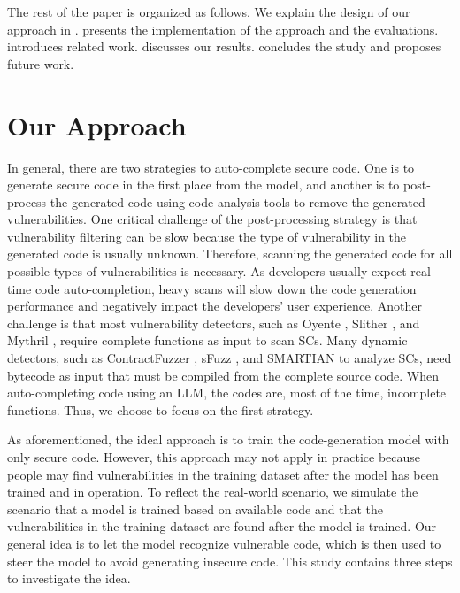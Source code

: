 \documentclass[12pt]{book}
\begin{document}
The rest of the paper is organized as follows. We explain the design of our approach in .  presents the implementation of the approach and the evaluations.  introduces related work.  discusses our results.  concludes the study and proposes future work.

\section{Our Approach}
\label{chap:methodology}

In general, there are two strategies to auto-complete secure code. One is to generate secure code in the first place from the model, and another is to post-process the generated code using code analysis tools to remove the generated vulnerabilities. One critical challenge of the post-processing strategy is that vulnerability filtering can be slow because the type of vulnerability in the generated code is usually unknown. Therefore, scanning the generated code for all possible types of vulnerabilities is necessary. As developers usually expect real-time code auto-completion, heavy scans will slow down the code generation performance and negatively impact the developers' user experience. Another challenge is that most vulnerability detectors, such as Oyente \cite{oyente2016making}, Slither \cite{feist2019slither}, and Mythril \cite{mythril}, require complete functions as input to scan SCs. Many dynamic detectors, such as ContractFuzzer \cite{ContractFuzzer}, sFuzz \cite{sFuzz}, and SMARTIAN \cite{SMARTIAN} to analyze SCs, need bytecode as input that must be compiled from the complete source code. When auto-completing code using an LLM, the codes are, most of the time, incomplete functions. Thus, we choose to focus on the first strategy. 

As aforementioned, the ideal approach is to train the code-generation model with only secure code. However, this approach may not apply in practice because people may find vulnerabilities in the training dataset after the model has been trained and in operation. To reflect the real-world scenario, we simulate the scenario that a model is trained based on available code and that the vulnerabilities in the training dataset are found after the model is trained. Our general idea is to let the model recognize vulnerable code, which is then used to steer the model to avoid generating insecure code. This study contains three steps to investigate the idea.
\end{document}
